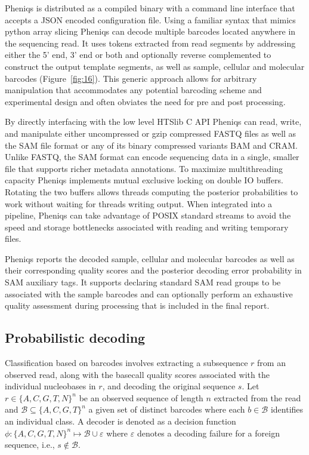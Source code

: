 \documentclass[10pt,twocolumn]{article}
\begin{document}
Pheniqs is distributed as a compiled binary with a command line interface that accepts a JSON encoded configuration file. Using a familiar syntax that mimics python array slicing Pheniqs can decode multiple barcodes located anywhere in the sequencing read. It uses tokens extracted from read segments by addressing either the 5’ end, 3’ end or both and optionally reverse complemented to construct the output template segments, as well as sample, cellular and molecular barcodes (Figure~\ref{fig:16}). This generic approach allows for arbitrary manipulation that accommodates any potential barcoding scheme and experimental design and often obviates the need for pre and post processing.

By directly interfacing with the low level HTSlib C API Pheniqs can read, write, and manipulate either uncompressed or gzip compressed FASTQ files as well as the SAM file format or any of its binary compressed variants BAM and CRAM. Unlike FASTQ, the SAM format can encode sequencing data in a single, smaller file that supports richer metadata annotations. To maximize multithreading capacity Pheniqs implements mutual exclusive locking on double IO buffers. Rotating the two buffers allows threads computing the posterior probabilities to work without waiting for threads writing output. When integrated into a pipeline, Pheniqs can take advantage of POSIX standard streams to avoid the speed and storage bottlenecks associated with reading and writing temporary files.

Pheniqs reports the decoded sample, cellular and molecular barcodes as well as their corresponding quality scores and the posterior decoding error probability in SAM auxiliary tags. It supports declaring standard SAM read groups to be associated with the sample barcodes and can optionally perform an exhaustive quality assessment during processing that is included in the final report.

\subsection*{Probabilistic decoding}

Classification based on barcodes involves extracting a subsequence $r$ from an observed read, along with the basecall quality scores associated with the individual nucleobases in $r$, and decoding the original sequence $s$. Let $r \in \{A,C,G,T,N\}^n$ be an observed sequence of length $n$ extracted from the read and $\mathcal{B} \subseteq \{A,C,G,T\}^n$ a given set of distinct barcodes where each $b \in \mathcal{B}$ identifies an individual class. A decoder is denoted as a decision function $\phi: \{A,C,G,T,N\}^n \mapsto \mathcal{B} \cup \varepsilon$ where $\varepsilon$ denotes a decoding failure for a foreign sequence, i.e., $s \notin \mathcal{B}$.
\end{document}
